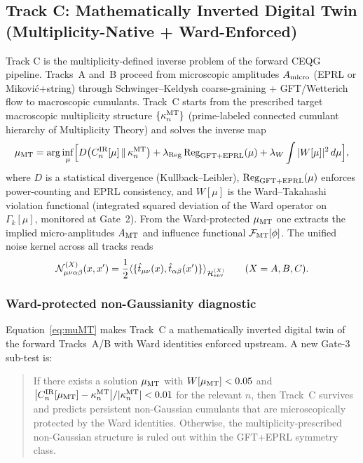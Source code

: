 \documentclass[11pt]{article}
\begin{document}
\subsection{Track C: Mathematically Inverted Digital Twin (Multiplicity-Native + Ward-Enforced)}
Track C is the multiplicity-defined inverse problem of the forward CEQG pipeline. Tracks~A and~B proceed from microscopic amplitudes $A_{\rm micro}$ (EPRL or Mikovi\'c+string) through Schwinger--Keldysh coarse-graining + GFT/Wetterich flow to macroscopic cumulants. Track~C starts from the prescribed target macroscopic multiplicity structure $\{\kappa_n^{\rm MT}\}$ (prime-labeled connected cumulant hierarchy of Multiplicity Theory) and solves the inverse map
\begin{equation}
\mu_{\rm MT} = \arg\inf_{\mu} \Bigl[ 
D\bigl(C_n^{\rm IR}[\mu] \,\Vert\, \kappa_n^{\rm MT}\bigr) 
+ \lambda_{\rm Reg}\,\text{Reg}_{\rm GFT+EPRL}(\mu) 
+ \lambda_W \int |W[\mu]|^2\,d\mu 
\Bigr],
\label{eq:muMT}
\end{equation}
where $D$ is a statistical divergence (Kullback--Leibler), $\text{Reg}_{\rm GFT+EPRL}(\mu)$ enforces power-counting and EPRL consistency, and $W[\mu]$ is the Ward--Takahashi violation functional (integrated squared deviation of the Ward operator on $\Gamma_k[\mu]$, monitored at Gate~2). From the Ward-protected $\mu_{\rm MT}$ one extracts the implied micro-amplitudes $A_{\rm MT}$ and influence functional $\mathcal{F}_{\rm MT}[\phi]$. The unified noise kernel across all tracks reads
\[
\mathcal{N}_{\mu\nu\alpha\beta}^{(X)}(x,x') = \frac12 \langle \{\hat{t}_{\mu\nu}(x),\hat{t}_{\alpha\beta}(x')\}\rangle_{\mathcal{H}_{\rm env}^{(X)}} \qquad (X=A,B,C).
\]

\subsubsection{Ward-protected non-Gaussianity diagnostic}
Equation~\eqref{eq:muMT} makes Track~C a mathematically inverted digital twin of the forward Tracks~A/B with Ward identities enforced upstream. A new Gate-3 sub-test is:

\begin{quote}
If there exists a solution $\mu_{\rm MT}$ with $W[\mu_{\rm MT}] < 0.05$ and $\bigl|C_n^{\rm IR}[\mu_{\rm MT}] - \kappa_n^{\rm MT}\bigr|/|\kappa_n^{\rm MT}| < 0.01$ for the relevant $n$, then Track~C survives and predicts persistent non-Gaussian cumulants that are microscopically protected by the Ward identities. Otherwise, the multiplicity-prescribed non-Gaussian structure is ruled out within the GFT+EPRL symmetry class.
\end{quote}
\end{document}
